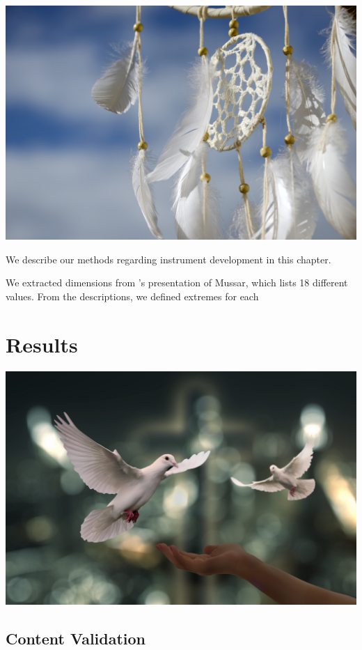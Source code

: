 \documentclass[
]{book}
\begin{document}
\includegraphics{dream-catcher-g6ec41bb43_1920.jpg}

We describe our methods regarding instrument development in this chapter.

We extracted dimensions from \citet{morinis2008everyday}'s presentation of Mussar, which lists 18 different values. From the descriptions, we defined extremes for each

\hypertarget{results}{%
\chapter{Results}\label{results}}

\includegraphics{doves-g750d44923_1920.jpg}

\hypertarget{content-validation}{%
\section{Content Validation}\label{content-validation}}
\end{document}
